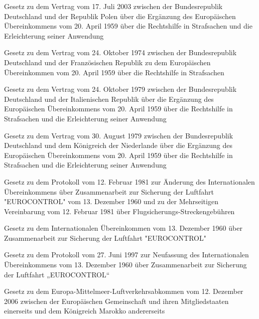 \item[{EuRHiÜbkErgVtrPOLG}] Gesetz zu dem Vertrag vom 17. Juli 2003 zwischen der Bundesrepublik Deutschland und der Republik Polen über die Ergänzung des Europäischen Übereinkommens vom 20. April 1959 über die Rechtshilfe in Strafsachen und die Erleichterung seiner Anwendung

\item[{EuRHiÜbkVtrFRAG}] Gesetz zu dem Vertrag vom 24. Oktober 1974 zwischen der Bundesrepublik Deutschland und der Französischen Republik zu dem Europäischen Übereinkommen vom 20. April 1959 über die Rechtshilfe in Strafsachen

\item[{EuRHiÜbkVtrITAG}] Gesetz zu dem Vertrag vom 24. Oktober 1979 zwischen der Bundesrepublik Deutschland und der Italienischen Republik über die Ergänzung des Europäischen Übereinkommens vom 20. April 1959 über die Rechtshilfe in Strafsachen und die Erleichterung seiner Anwendung

\item[{EuRHiÜbkVtrNLDG}] Gesetz zu dem Vertrag vom 30. August 1979 zwischen der Bundesrepublik Deutschland und dem Königreich der Niederlande über die Ergänzung des Europäischen Übereinkommens vom 20. April 1959 über die Rechtshilfe in Strafsachen und die Erleichterung seiner Anwendung

\item[{EUROCONTROLÜbkÄndProtG}] Gesetz zu dem Protokoll vom 12. Februar 1981 zur Änderung des Internationalen Übereinkommens über Zusammenarbeit zur Sicherung der Luftfahrt "EUROCONTROL" vom 13. Dezember 1960 und zu der Mehrseitigen Vereinbarung vom 12. Februar 1981 über Flugsicherungs-Streckengebühren

\item[{EUROCONTROLÜbkG}] Gesetz zu dem Internationalen Übereinkommen vom 13. Dezember 1960 über Zusammenarbeit zur Sicherung der Luftfahrt "EUROCONTROL"

\item[{EUROCONTROLÜbkNFProtG}] Gesetz zu dem Protokoll vom 27. Juni 1997 zur Neufassung des Internationalen Übereinkommens vom 13. Dezember 1960 über Zusammenarbeit zur Sicherung der Luftfahrt „EUROCONTROL“

\item[{Euromed-LuftvAbkG-Marok}] Gesetz zu dem Europa-Mittelmeer-Luftverkehrsabkommen vom 12. Dezember 2006 zwischen der Europäischen Gemeinschaft und ihren Mitgliedstaaten einerseits und dem Königreich Marokko andererseits

